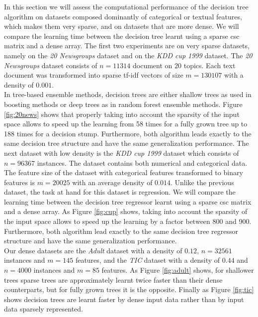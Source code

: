 In this section we will assess the computational performance of the decision tree algorithm on datasets composed dominantly of categorical or textual features, which makes them very sparse, and on datasets that are more dense. We will compare the learning time between the decision tree learnt
using a sparse csc matrix and a dense array.
The first two experiments are on very sparse datasets, namely on the \emph{20 Newsgroups} dataset \cite{joachims1996probabilistic} and on the \emph{KDD cup 1999} dataset\cite{bay2000archive}. The \emph{20 Newsgroups} dataset
consists of $n=11314$ document on $20$ topics. Each text document was
transformed into sparse tf-idf vectors of size $m=130107$ with a density of
$0.001$. \\
In tree-based ensemble methods, decision trees are either shallow trees as used
in boosting methods or deep trees as in random forest ensemble methods. Figure
\ref{fig:20news} shows that properly taking into account the sparsity of the
input space allows to speed up the learning from 58 times for a fully grown
tree up to 188 times for a decision stump. Furthermore, both algorithm leads
exactly to the same decision tree structure and have the same generalization
performance. The next dataset with low density is the \emph{KDD cup 1999} dataset which consists of $n=96367$ instances. The dataset contains both numerical and categorical data. The feature size of the dataset with categorical features transformed to binary features is $m=20025$ with an average density of
$0.014$. Unlike the previous dataset, the task at hand for this dataset is regression. We will compare the learning time between the decision tree regressor learnt
using a sparse csc matrix and a dense array. As Figure \ref{fig:cup} shows, taking into account the sparsity of the
input space allows to speed up the learning by a factor between 800 and 900. Furthermore, both algorithm lead
exactly to the same decision tree regressor structure and have the same generalization
performance.\\

Our dense datasets are the \emph{Adult} dataset\cite{Bache+Lichman:2013} with a density of $0.12$, $n=32561$ instances and  $m=145$ features, and the \emph{TIC} dataset\cite{Bache+Lichman:2013} with a density of $0.44$ and $n=4000$ instances and $m=85$ features. As Figure \ref{fig:adult} shows, for shallower trees sparse trees are approximately learnt twice faster than their dense counterparts, but for fully grown trees it is the opposite. Finally as Figure \ref{fig:tic} shows decision trees are learnt faster by dense input data rather than by input data sparsely represented. 


